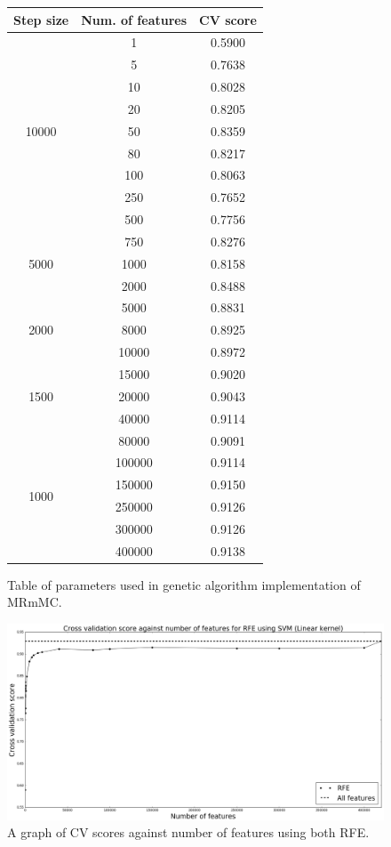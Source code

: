 \documentclass[12pt, twoside, a4paper]{report}
\begin{document}
\begin{figure}
\centering
    \begin{tabular}{ | c | c | c | } \hline
    Step size & Num. of features & CV score \\ \hline
    \multirow{9}{*}{10000} & 
  1 & 0.5900  \\
 & 5 & 0.7638   \\
 & 10 & 0.8028  \\
 & 20 & 0.8205  \\
 & 50 & 0.8359 \\
 & 80 & 0.8217 \\
 & 100 & 0.8063 \\
 & 250 & 0.7652 \\
 & 500 & 0.7756 \\ \hline
 
 \multirow{3}{*}{5000} & 
  750 & 0.8276  \\
 & 1000 & 0.8158 \\
 & 2000 & 0.8488 \\ \hline
 
 \multirow{3}{*}{2000} & 
  5000 & 0.8831 \\
 & 8000 & 0.8925 \\
 & 10000 & 0.8972 \\ \hline
 
 \multirow{3}{*}{1500} & 
  15000 & 0.9020 \\
 & 20000 & 0.9043 \\
 & 40000 & 0.9114 \\ \hline
 
 \multirow{6}{*}{1000} & 
  80000 & 0.9091 \\
 & 100000 & 0.9114 \\
 & 150000 & 0.9150 \\
  & 250000 & 0.9126 \\
   & 300000 & 0.9126 \\
    & 400000 & 0.9138 \\ \hline
    \end{tabular}
\caption{Table of parameters used in genetic algorithm implementation of MRmMC.}
\label{rfe_results_table}
\end{figure}


\begin{figure}
\centering
\includegraphics[width=\textwidth]{images/rfe_linear_all.jpeg}
\caption{A graph of CV scores against number of features using both RFE.}
\label{body:rfe:graph}
\end{figure}
\end{document}
